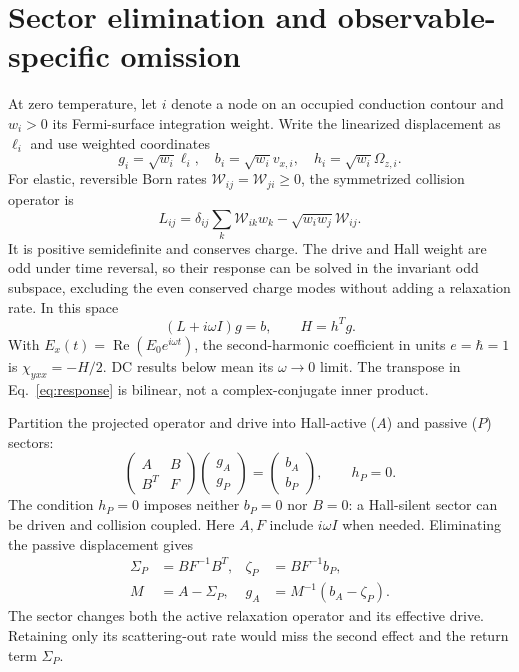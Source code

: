 \section{Sector elimination and observable-specific omission}
At zero temperature, let $i$ denote a node on an occupied conduction contour and $w_i>0$ its Fermi-surface integration weight. Write the linearized displacement as $\ell_i$ and use weighted coordinates
\begin{equation}
g_i=\sqrt{w_i}\ell_i,\quad b_i=\sqrt{w_i}v_{x,i},\quad
h_i=\sqrt{w_i}\Omega_{z,i}.
\end{equation}
For elastic, reversible Born rates $\mathcal W_{ij}=\mathcal W_{ji}\geq0$, the symmetrized collision operator is
\begin{equation}
L_{ij}=\delta_{ij}\sum_k\mathcal W_{ik}w_k
-\sqrt{w_iw_j}\mathcal W_{ij}.\label{eq:L}
\end{equation}
It is positive semidefinite and conserves charge. The drive and Hall weight are odd under time reversal, so their response can be solved in the invariant odd subspace, excluding the even conserved charge modes without adding a relaxation rate. In this space
\begin{equation}
(L+i\omega I)g=b,\qquad H=h^Tg.\label{eq:response}
\end{equation}
With $E_x(t)=\operatorname{Re}(E_0e^{i\omega t})$, the second-harmonic coefficient in units $e=\hbar=1$ is $\chi_{yxx}=-H/2$. DC results below mean its $\omega\to0$ limit. The transpose in Eq.~\eqref{eq:response} is bilinear, not a complex-conjugate inner product.

Partition the projected operator and drive into Hall-active ($A$) and passive ($P$) sectors:
\begin{equation}
\begin{pmatrix}A&B\\B^T&F\end{pmatrix}
\begin{pmatrix}g_A\\g_P\end{pmatrix}
=\begin{pmatrix}b_A\\b_P\end{pmatrix},\qquad h_P=0.
\end{equation}
The condition $h_P=0$ imposes neither $b_P=0$ nor $B=0$: a Hall-silent sector can be driven and collision coupled. Here $A,F$ include $i\omega I$ when needed. Eliminating the passive displacement gives
\begin{align}
\Sigma_P&=BF^{-1}B^T,&\zeta_P&=BF^{-1}b_P,\\
M&=A-\Sigma_P,&g_A&=M^{-1}(b_A-\zeta_P).\label{eq:schur}
\end{align}
The sector changes both the active relaxation operator and its effective drive. Retaining only its scattering-out rate would miss the second effect and the return term $\Sigma_P$.

